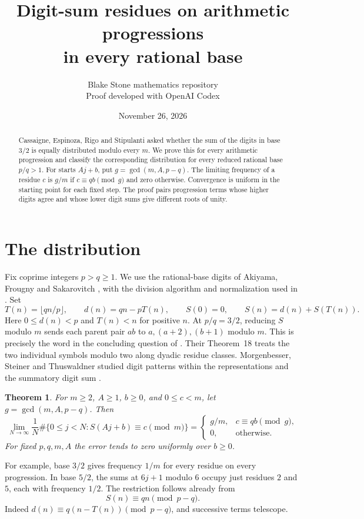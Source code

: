 \documentclass[11pt]{article}
\title{Digit-sum residues on arithmetic progressions\\in every rational base}
\author{Blake Stone mathematics repository\\[-2pt]\small Proof developed with OpenAI Codex}
\date{November 26, 2026}
\newtheorem{theorem}{Theorem}
\begin{document}
\maketitle
\begin{abstract}
Cassaigne, Espinoza, Rigo and Stipulanti asked whether the sum of the digits in
base $3/2$ is equally distributed modulo every $m$. We prove this for every
arithmetic progression and classify the corresponding distribution for every reduced
rational base $p/q>1$. For starts $Aj+b$, put $g=\gcd(m,A,p-q)$. The limiting
frequency of a residue $c$ is $g/m$ if $c\equiv qb\pmod g$ and zero otherwise.
Convergence is uniform in the starting point for each fixed step. The proof pairs
progression terms whose higher digits agree and whose lower digit sums give
different roots of unity.
\end{abstract}

\section{The distribution}
Fix coprime integers $p>q\ge1$. We use the rational-base digits of Akiyama,
Frougny and Sakarovitch \cite{afs}, with the division algorithm and normalization
used in \cite{mst}. Set
\[
 T(n)=\lfloor qn/p\rfloor,\qquad d(n)=qn-pT(n),\qquad
 S(0)=0,\qquad S(n)=d(n)+S(T(n)).
\]
Here $0\le d(n)<p$ and $T(n)<n$ for positive $n$. At $p/q=3/2$, reducing
$S$ modulo $m$ sends each parent pair $ab$ to $a,(a+2),(b+1)$ modulo $m$.
This is precisely the word in the concluding question of \cite{cers}.
Their Theorem~18 treats the two individual symbols modulo two along dyadic
residue classes. Morgenbesser, Steiner and Thuswaldner studied digit patterns
within the representations and the summatory digit sum \cite{mst}.

\begin{theorem}\label{main}
For $m\ge2$, $A\ge1$, $b\ge0$, and $0\le c<m$, let $g=\gcd(m,A,p-q)$.
Then
\[
\lim_{N\to\infty}\frac1N\#\{0\le j<N:S(Aj+b)\equiv c\pmod m\}
=\begin{cases} g/m,&c\equiv qb\pmod g,\\ 0,&\text{otherwise}.\end{cases}
\]
For fixed $p,q,m,A$ the error tends to zero uniformly over $b\ge0$.
\end{theorem}
For example, base $3/2$ gives frequency $1/m$ for every residue on every
progression. In base $5/2$, the sums at $6j+1$ modulo $6$ occupy just
residues $2$ and $5$, each with frequency $1/2$. The restriction follows
already from
\begin{equation}
 S(n)\equiv qn\pmod{p-q}.\label{congruence}
\end{equation}
Indeed $d(n)\equiv q(n-T(n))\pmod{p-q}$, and successive terms telescope.
\end{document}
